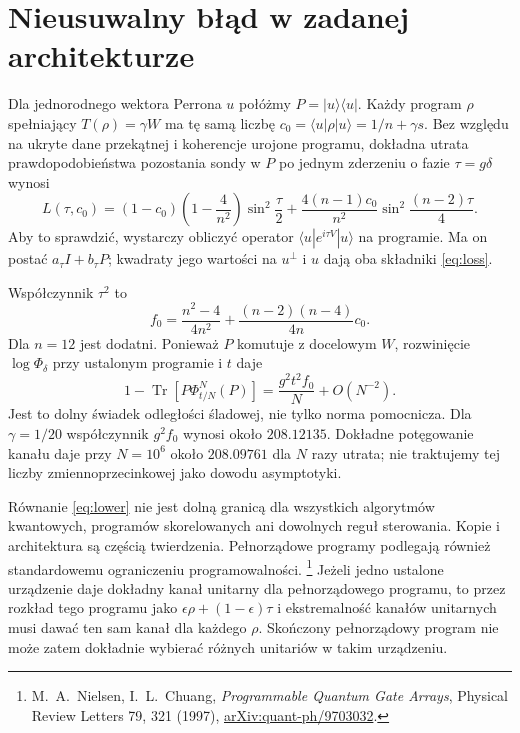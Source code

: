 \documentclass[11pt,a4paper]{article}
\newcommand{\Tr}{\operatorname{Tr}}
\begin{document}
\section{Nieusuwalny błąd w zadanej architekturze}

Dla jednorodnego wektora Perrona $u$ połóżmy $P=|u\rangle\langle u|$.
Każdy program $\rho$ spełniający $T(\rho)=\gamma W$ ma tę samą liczbę
$c_0=\langle u|\rho|u\rangle=1/n+\gamma s$.
Bez względu na ukryte dane przekątnej i koherencje urojone programu,
dokładna utrata prawdopodobieństwa pozostania sondy w $P$ po jednym
zderzeniu o fazie $\tau=g\delta$ wynosi
\begin{equation}\label{eq:loss}
 L(\tau,c_0)=(1-c_0)\left(1-\frac4{n^2}\right)\sin^2\frac\tau2
     +\frac{4(n-1)c_0}{n^2}\sin^2\frac{(n-2)\tau}{4}.
\end{equation}
Aby to sprawdzić, wystarczy obliczyć operator
$\langle u|e^{i\tau V}|u\rangle$ na programie. Ma on postać
$a_\tau I+b_\tau P$; kwadraty jego wartości na $u^\perp$ i $u$
dają oba składniki \eqref{eq:loss}.

Współczynnik $\tau^2$ to
\[
 f_0=\frac{n^2-4}{4n^2}+\frac{(n-2)(n-4)}{4n}c_0.
\]
Dla $n=12$ jest dodatni. Ponieważ $P$ komutuje z docelowym $W$,
rozwinięcie $\log\Phi_\delta$ przy ustalonym programie i $t$ daje
\begin{equation}\label{eq:lower}
 1-\Tr[P\Phi_{t/N}^N(P)]
     =\frac{g^2t^2f_0}{N}+O(N^{-2}).
\end{equation}
Jest to dolny świadek odległości śladowej, nie tylko norma pomocnicza.
Dla $\gamma=1/20$ współczynnik $g^2f_0$ wynosi około $208.12135$.
Dokładne potęgowanie kanału daje przy $N=10^6$ około $208.09761$
dla $N$ razy utrata; nie traktujemy tej liczby zmiennoprzecinkowej
jako dowodu asymptotyki.

Równanie \eqref{eq:lower} nie jest dolną granicą dla wszystkich
algorytmów kwantowych, programów skorelowanych ani dowolnych reguł
sterowania. Kopie i architektura są częścią twierdzenia.
Pełnorządowe programy podlegają również standardowemu ograniczeniu
programowalności.
\footnote{M.~A.~Nielsen, I.~L.~Chuang, \emph{Programmable Quantum Gate Arrays},
Physical Review Letters 79, 321 (1997),
\href{https://arxiv.org/abs/quant-ph/9703032}{arXiv:quant-ph/9703032}.}
Jeżeli jedno ustalone urządzenie daje dokładny kanał unitarny dla
pełnorządowego programu, to przez rozkład tego programu jako
$\epsilon\rho+(1-\epsilon)\tau$ i ekstremalność kanałów unitarnych
musi dawać ten sam kanał dla każdego $\rho$.
Skończony pełnorządowy program nie może zatem dokładnie wybierać
różnych unitariów w takim urządzeniu.
\end{document}

